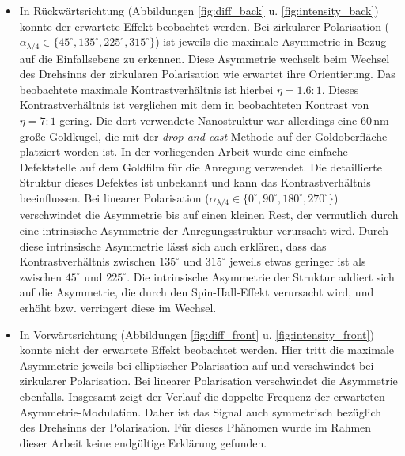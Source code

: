 \documentclass[titlepage,  ngerman]{article}
\begin{document}
		\begin{itemize}
			\item In Rückwärtsrichtung (Abbildungen \ref{fig:diff_back} u. \ref{fig:intensity_back}) konnte der erwartete Effekt beobachtet werden. Bei zirkularer Polarisation ($\alpha_{\lambda/4} \in \{45^\circ, 135^\circ, 225^\circ, 315^\circ\}$) ist jeweils die maximale Asymmetrie in Bezug auf die Einfallsebene zu erkennen. Diese Asymmetrie wechselt beim Wechsel des Drehsinns der zirkularen Polarisation wie erwartet ihre Orientierung. Das beobachtete maximale Kontrastverhältnis ist hierbei $\eta = 1.6:1$. Dieses Kontrastverhältnis ist verglichen mit dem in \cite{OConnor.2014} beobachteten Kontrast von $\eta =7:1$ gering.  Die dort verwendete Nanostruktur war allerdings eine  $60\,\mathrm{nm}$ große Goldkugel, die mit der \textit{drop and cast} Methode auf der Goldoberfläche platziert worden ist. In der vorliegenden Arbeit wurde eine einfache Defektstelle auf dem Goldfilm für die Anregung verwendet. Die detaillierte Struktur dieses Defektes ist unbekannt und kann das Kontrastverhältnis beeinflussen.  Bei linearer Polarisation ($\alpha_{\lambda/4} \in \{0^\circ, 90^\circ, 180^\circ, 270^\circ\}$) verschwindet die Asymmetrie bis auf einen kleinen Rest, der vermutlich durch eine intrinsische Asymmetrie der Anregungsstruktur verursacht wird. Durch diese intrinsische Asymmetrie lässt sich auch erklären, dass das Kontrastverhältnis zwischen $135^\circ$ und $ 315^\circ$ jeweils etwas geringer ist als zwischen $45^\circ$ und $225^\circ$.
			Die intrinsische Asymmetrie der Struktur addiert sich auf die Asymmetrie, die durch den Spin-Hall-Effekt verursacht wird, und erhöht bzw. verringert diese im Wechsel.
			\item In Vorwärtsrichtung (Abbildungen \ref{fig:diff_front} u. \ref{fig:intensity_front}) konnte nicht der erwartete Effekt beobachtet werden. Hier tritt die maximale Asymmetrie jeweils bei elliptischer Polarisation auf und verschwindet bei zirkularer Polarisation. Bei linearer Polarisation verschwindet die Asymmetrie ebenfalls. Insgesamt zeigt der Verlauf die doppelte Frequenz der erwarteten Asymmetrie-Modulation. Daher ist das Signal auch symmetrisch bezüglich des Drehsinns der Polarisation. Für dieses Phänomen wurde im Rahmen dieser Arbeit keine endgültige Erklärung gefunden.
			

\end{itemize}
\end{document}
